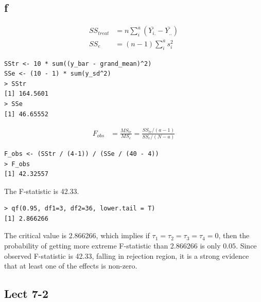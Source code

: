 \documentclass[11pt,letterpaper]{article}
\begin{document}
\subsection*{f}
\begin{align*}
SS_{treat} &= n \sum_i^a (\bar{Y_{i.}} - \bar{Y_{..}}) \\
SS_e &= (n-1) \sum_i^a s_i^2
\end{align*}
\begin{verbatim}
SStr <- 10 * sum((y_bar - grand_mean)^2)
SSe <- (10 - 1) * sum(y_sd^2)
> SStr
[1] 164.5601
> SSe
[1] 46.65552
\end{verbatim}
\begin{align*}
F_{obs} &= \frac{MS_{tr}}{MS_e} = \frac{SS_{tr} / (a - 1)}{SS_e / (N - a)} 
\end{align*}
\begin{verbatim}
F_obs <- (SStr / (4-1)) / (SSe / (40 - 4))
> F_obs
[1] 42.32557
\end{verbatim}
\noindent The F-statistic is 42.33. 
\begin{verbatim}
> qf(0.95, df1=3, df2=36, lower.tail = T)
[1] 2.866266
\end{verbatim}
\noindent The critical value is 2.866266, which implies if $\tau_1 = \tau_2 = \tau_3 = \tau_4 = 0$, then the probability of getting more extreme F-statistic than 2.866266 is only $0.05$. Since observed F-statistic is 42.33, falling in rejection region, it is a strong evidence that at least one of the effects is non-zero.

\subsection*{Lect 7-2}
\end{document}

